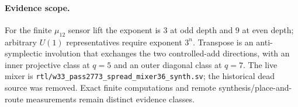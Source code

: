 \paragraph{Evidence scope.}
For the finite $\mu_{12}$ sensor lift the exponent is $3$ at odd depth and $9$ at even
depth; arbitrary $U(1)$ representatives require exponent $3^n$.  Transpose is an
anti-symplectic involution that exchanges the two controlled-add directions, with an
inner projective class at $q=5$ and an outer diagonal class at $q=7$.  The live mixer is
\texttt{rtl/w33\_pass2773\_spread\_mixer36\_synth.sv}; the historical dead source was
removed.  Exact finite computations and remote synthesis/place-and-route measurements
remain distinct evidence classes.
